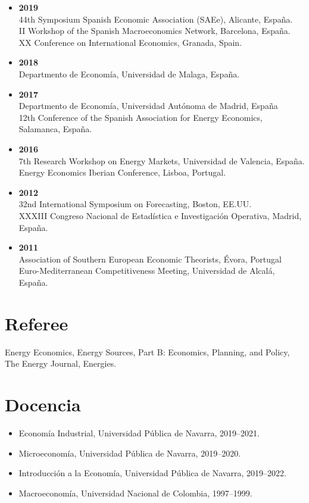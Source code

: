 \documentclass[11pt]{article}\usepackage[]{graphicx}\usepackage[usenames,dvipsnames]{xcolor}
\begin{document}
\begin{itemize}
  \item \textbf{2019}\\
  44th Symposium Spanish Economic Association (SAEe), Alicante, España.\\
  II Workshop of the Spanish Macroeconomics Network, Barcelona, España.\\
  XX Conference on International Economics, Granada, Spain.
  \item \textbf{2018}\\
  Departmento de Economía, Universidad de Malaga, España.
    \item \textbf{2017}\\
  Departmento de Economía, Universidad Autónoma de Madrid, España\\
  12th Conference of the Spanish Association for Energy Economics, Salamanca, España.
  \item \textbf{2016}\\
  7th Research Workshop on Energy Markets, Universidad de Valencia, España.\\
  Energy Economics Iberian Conference, Lisboa, Portugal.
  \item \textbf{2012}\\
  32nd International Symposium on Forecasting, Boston, EE.UU.\\
  XXXIII Congreso Nacional de Estadística e Investigación Operativa, Madrid, España.
  \item \textbf{2011}\\
  Association of Southern European Economic Theorists, Évora, Portugal\\
  Euro-Mediterranean Competitiveness Meeting, Universidad de Alcalá, España.
\end{itemize}

\section{Referee} 

\raggedright
Energy Economics, Energy Sources, Part B: Economics, Planning, and Policy, The Energy Journal,  Energies.


\section{Docencia} 

\begin{itemize}
  \item Economía Industrial, Universidad Pública de Navarra, 2019--2021.
  \item Microeconomía, Universidad Pública de Navarra, 2019--2020.
  \item Introducción a la Economía, Universidad Pública de Navarra, 2019--2022.
  \item Macroeconomía, Universidad Nacional de Colombia, 1997--1999.
\end{itemize}
\end{document}
